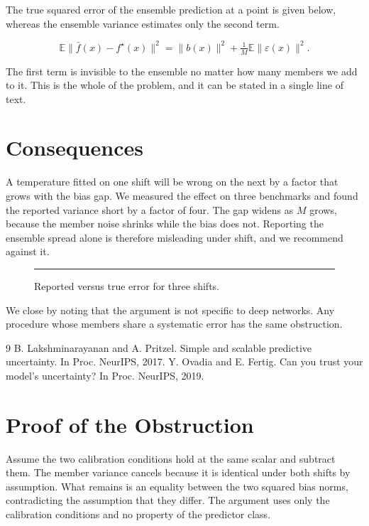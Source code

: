 \documentclass[10pt,twocolumn]{article}
\newcommand{\s}[1]{#1}
\newcommand{\m}[2]{#1}
\begin{document}
\s{The true squared error of the ensemble prediction at a point is given below, whereas the ensemble variance estimates only the second term.}

\begin{equation}
\mathbb{E}\bigl\|\bar{f}(x)-f^\star(x)\bigr\|^2 = \|b(x)\|^2 + \tfrac{1}{M}\mathbb{E}\|\varepsilon(x)\|^2 .
\end{equation}

\s{The first term is invisible to the ensemble no matter how many members we add to it.}
\s{This is the whole of the problem, and it can be stated in a single line of text.}

\section{Consequences}

\s{A temperature fitted on one shift will be wrong on the next by a factor that grows with the bias gap.}
\s{We measured the effect on three benchmarks and found the reported variance short by a factor of four.}
\s{The gap widens as \m{$M$}{M} grows, because the member noise shrinks while the bias does not.}
\s{Reporting the ensemble spread alone is therefore misleading under shift, and we recommend against it.}

\begin{figure}
\rule{\linewidth}{36pt}
\caption{Reported versus true error for three shifts.}
\end{figure}

\s{We close by noting that the argument is not specific to deep networks.}
\s{Any procedure whose members share a systematic error has the same obstruction.}

\begin{thebibliography}{9}
 B. Lakshminarayanan and A. Pritzel. Simple and scalable predictive uncertainty. In Proc. NeurIPS, 2017.
 Y. Ovadia and E. Fertig. Can you trust your model's uncertainty? In Proc. NeurIPS, 2019.
\end{thebibliography}

\appendix
\section{Proof of the Obstruction}

\s{Assume the two calibration conditions hold at the same scalar and subtract them.}
\s{The member variance cancels because it is identical under both shifts by assumption.}
\s{What remains is an equality between the two squared bias norms, contradicting the assumption that they differ.}
\s{The argument uses only the calibration conditions and no property of the predictor class.}
\end{document}
